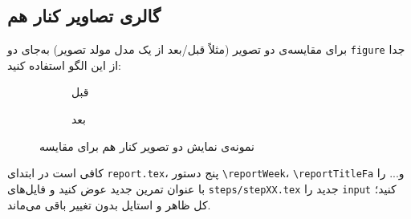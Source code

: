 \subsection{گالری تصاویر کنار هم}
برای مقایسه‌ی دو تصویر (مثلاً قبل/بعد از یک مدل مولد تصویر) به‌جای دو \texttt{figure} جدا از این الگو استفاده کنید:

\begin{figure}[h!]
\centering
\begin{subfigure}{0.46\textwidth}
    \centering
    \fbox{\rule{0pt}{3cm}\rule{3cm}{0pt}} %
    \caption{قبل}
\end{subfigure}
\hfill
\begin{subfigure}{0.46\textwidth}
    \centering
    \fbox{\rule{0pt}{3cm}\rule{3cm}{0pt}} %
    \caption{بعد}
\end{subfigure}
\caption{نمونه‌ی نمایش دو تصویر کنار هم برای مقایسه}
\label{fig:before_after_demo}
\end{figure}

\begin{notebox}
کافی است در ابتدای \texttt{report.tex}، پنج دستور \texttt{\textbackslash reportWeek}، \texttt{\textbackslash reportTitleFa} و... را با عنوان تمرین جدید عوض کنید و فایل‌های \texttt{steps/stepXX.tex} جدید را \texttt{input} کنید؛ کل ظاهر و استایل بدون تغییر باقی می‌ماند.
\end{notebox}
